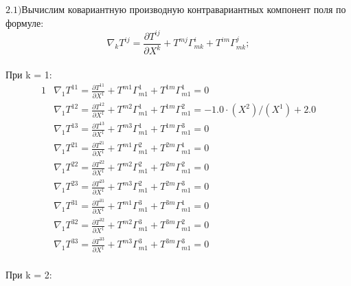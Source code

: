 \documentclass{article}
\begin{document}
$\mathrm{2.1) }$Вычислим ковариантную производную контравариантных компонент поля по формуле:\\
\[
\nabla_kT^{ij} = \frac{\partial T^{ij}}{\partial X^k} + T^{mj}\Gamma^i_{mk} + T^{im}\Gamma^j_{mk};
\]\\
При k = 1:\\
\begin{alignat*}{1}
  & \nabla_1T^{11} = \frac{\partial T^{11}}{\partial X^1} + T^{m1}\Gamma^1_{m1} + T^{1m}\Gamma^1_{m1} = 0 \\
  & \nabla_1T^{12} = \frac{\partial T^{12}}{\partial X^1} + T^{m2}\Gamma^1_{m1} + T^{1m}\Gamma^2_{m1} = -1.0\cdot (X^2)/(X^1) + 2.0 \\
  & \nabla_1T^{13} = \frac{\partial T^{13}}{\partial X^1} + T^{m3}\Gamma^1_{m1} + T^{1m}\Gamma^3_{m1} = 0 \\
  & \nabla_1T^{21} = \frac{\partial T^{21}}{\partial X^1} + T^{m1}\Gamma^2_{m1} + T^{2m}\Gamma^1_{m1} = 0 \\
  & \nabla_1T^{22} = \frac{\partial T^{22}}{\partial X^1} + T^{m2}\Gamma^2_{m1} + T^{2m}\Gamma^2_{m1} = 0 \\
  & \nabla_1T^{23} = \frac{\partial T^{23}}{\partial X^1} + T^{m3}\Gamma^2_{m1} + T^{2m}\Gamma^3_{m1} = 0 \\
  & \nabla_1T^{31} = \frac{\partial T^{31}}{\partial X^1} + T^{m1}\Gamma^3_{m1} + T^{3m}\Gamma^1_{m1} = 0 \\
  & \nabla_1T^{32} = \frac{\partial T^{32}}{\partial X^1} + T^{m2}\Gamma^3_{m1} + T^{3m}\Gamma^2_{m1} = 0 \\
  & \nabla_1T^{33} = \frac{\partial T^{33}}{\partial X^1} + T^{m3}\Gamma^3_{m1} + T^{3m}\Gamma^3_{m1} = 0 
\end{alignat*}\\
При k = 2:\\
\end{document}
